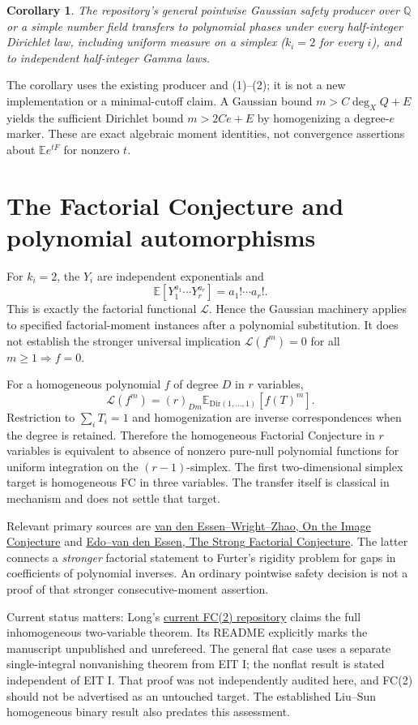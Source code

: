 \documentclass[11pt]{article}
\newtheorem{corollary}[proposition]{Corollary}
\newcommand{\E}{\mathbb E}
\begin{document}
\begin{corollary}
The repository's general pointwise Gaussian safety producer over
$\mathbb Q$ or a simple number field transfers to polynomial phases under
every half-integer Dirichlet law, including uniform measure on a simplex
($k_i=2$ for every $i$), and to independent half-integer Gamma laws.
\end{corollary}
The corollary uses the existing producer and (1)--(2); it is not a new
implementation or a minimal-cutoff claim. A Gaussian bound
$m>C\deg_X Q+E$ yields the sufficient Dirichlet bound $m>2Ce+E$ by
homogenizing a degree-$e$ marker. These are exact algebraic moment
identities, not convergence assertions about $\E e^{tF}$ for nonzero $t$.

\section{The Factorial Conjecture and polynomial automorphisms}

For $k_i=2$, the $Y_i$ are independent exponentials and
\[
       \E[Y_1^{a_1}\cdots Y_r^{a_r}]=a_1!\cdots a_r!.
\]
This is exactly the factorial functional $\mathcal L$. Hence the Gaussian
machinery applies to specified factorial-moment instances after a polynomial
substitution. It does not establish the stronger universal implication
$\mathcal L(f^m)=0$ for all $m\ge1\Rightarrow f=0$.

For a homogeneous polynomial $f$ of degree $D$ in $r$ variables,
\[
 \mathcal L(f^m)=(r)_{Dm}\E_{\mathrm{Dir}(1,\ldots,1)}[f(T)^m]. \tag{3}
\]
Restriction to $\sum_iT_i=1$ and homogenization are inverse correspondences
when the degree is retained. Therefore the homogeneous Factorial Conjecture
in $r$ variables is equivalent to absence of nonzero pure-null polynomial
functions for uniform integration on the $(r-1)$-simplex. The first
two-dimensional simplex target is homogeneous FC in three variables.
The transfer itself is classical in mechanism and does not settle that target.

Relevant primary sources are
\href{https://arxiv.org/abs/1008.3962}{van den Essen--Wright--Zhao,
On the Image Conjecture} and
\href{https://arxiv.org/abs/1304.3956}{Edo--van den Essen,
The Strong Factorial Conjecture}.
The latter connects a \emph{stronger} factorial statement to Furter's
rigidity problem for gaps in coefficients of polynomial inverses.
An ordinary pointwise safety decision is not a proof of that stronger
consecutive-moment assertion.

Current status matters: Long's
\href{https://github.com/long-mathematics/factorial-conjecture-two-variables}{current FC(2) repository}
claims the full inhomogeneous two-variable theorem. Its README explicitly
marks the manuscript unpublished and unrefereed. The general flat case
uses a separate single-integral nonvanishing theorem from EIT I; the
nonflat result is stated independent of EIT I. That proof was not
independently audited here, and FC(2) should not be advertised as an
untouched target. The established Liu--Sun homogeneous binary result
also predates this assessment.
\end{document}
